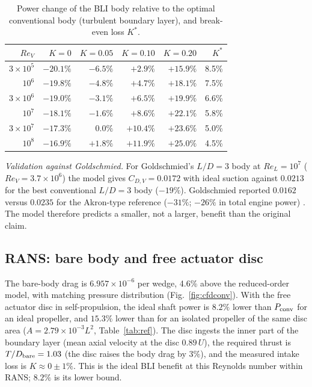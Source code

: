 \documentclass[11pt,a4paper]{article}
\newcommand{\ReV}{\mathit{Re}_V}
\newcommand{\ReL}{\mathit{Re}_L}
\begin{document}
\begin{table}[h]\centering
\caption{Power change of the BLI body relative to the optimal conventional body (turbulent
boundary layer), and break-even loss $K^*$.}\label{tab:kstar}
\begin{tabular}{rrrrrr}
\toprule
$\ReV$ & $K=0$ & $K=0.05$ & $K=0.10$ & $K=0.20$ & $K^*$\\
\midrule
$3\times10^5$ & $-20.1\%$ & $-6.5\%$ & $+2.9\%$ & $+15.9\%$ & 8.5\%\\
$10^6$ & $-19.8\%$ & $-4.8\%$ & $+4.7\%$ & $+18.1\%$ & 7.5\%\\
$3\times10^6$ & $-19.0\%$ & $-3.1\%$ & $+6.5\%$ & $+19.9\%$ & 6.6\%\\
$10^7$ & $-18.1\%$ & $-1.6\%$ & $+8.6\%$ & $+22.1\%$ & 5.8\%\\
$3\times10^7$ & $-17.3\%$ & $0.0\%$ & $+10.4\%$ & $+23.6\%$ & 5.0\%\\
$10^8$ & $-16.9\%$ & $+1.8\%$ & $+11.9\%$ & $+25.0\%$ & 4.5\%\\
\bottomrule
\end{tabular}
\end{table}

\emph{Validation against Goldschmied.} For Goldschmied's $L/D=3$ body at $\ReL=10^7$
($\ReV=3.7\times10^6$) the
model gives $C_{D,V}=0.0172$ with ideal suction against $0.0213$ for the best conventional
$L/D=3$ body ($-19\%$). Goldschmied reported $0.0162$ versus $0.0235$ for the Akron-type
reference ($-31\%$; $-26\%$ in total engine power) \cite{goldschmied1966}. The model therefore predicts a smaller, not a
larger, benefit than the original claim.

\subsection{RANS: bare body and free actuator disc}
The bare-body drag is $6.957\times10^{-6}$ per wedge, 4.6\% above the reduced-order model,
with matching pressure distribution (Fig.~\ref{fig:cfdconv}). With the free actuator disc
in self-propulsion, the ideal shaft power is $8.2\%$ lower than $P_{\rm conv}$ for an ideal
propeller, and $15.3\%$ lower than for an isolated propeller of the same disc area
($A=2.79\times10^{-3}L^2$, Table~\ref{tab:ref}). The disc
ingests the inner part of the boundary layer (mean axial velocity at the disc $0.89\,U$),
the required thrust is $T/D_{\rm bare}=1.03$ (the disc raises the body drag by 3\%), and the
measured intake loss is $K\approx0\pm1\%$. This is the ideal BLI benefit at this
Reynolds number within RANS; $8.2\%$ is its lower bound.
\end{document}
